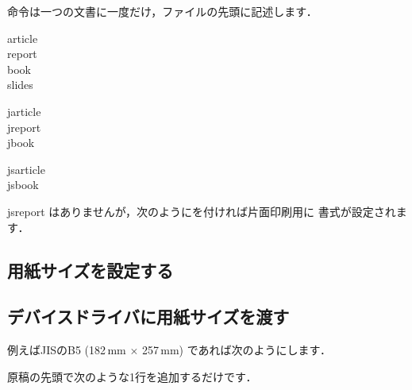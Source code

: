 
 命令は一つの文書に一度だけ，ファイルの先頭に記述します．


\begin{description}
 \item[article] 
 \item[report]
 \item[book]
 \item[slides]
\end{description}

\begin{description}
 \item[jarticle] 
 \item[jreport]
 \item[jbook]
\end{description}

\begin{description}
 \item[jsarticle] 
 \item[jsbook]
\end{description}

jsreport はありませんが，次のようにを付ければ片面印刷用に
書式が設定されます．


\subsection{用紙サイズを設定する}

\subsection{デバイスドライバに用紙サイズを渡す}

\begin{usage}
\end{usage}

%
%
例えばJISのB5 (182\,mm $\times$ 257\,mm) であれば次のようにします．
\begin{intext}
\end{intext}
原稿の先頭で次のような1行を追加するだけです．

